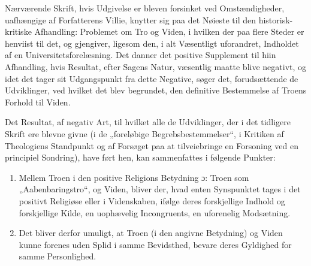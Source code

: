 Nærværende Skrift, hvis Udgivelse er bleven forsinket ved Omstændigheder,
uafhængige af Forfatterens Villie, knytter sig paa det Nøieste til den
historisk-kritiske Afhandling: Problemet om Tro og Viden, i hvilken der paa
flere Steder er henviist til det, og gjengiver, ligesom den, i alt Væsentligt
uforandret, Indholdet af en Universitetsforelæsning. Det danner det positive
Supplement til hiin Afhandling, hvis Resultat, efter Sagens Natur, væsentlig
maatte blive negativt, og idet det tager sit Udgangspunkt fra dette Negative,
søger det, forudsættende de Udviklinger, ved hvilket det blev begrundet, den
definitive Bestemmelse af Troens Forhold til Viden.

Det Resultat, af negativ Art, til hvilket alle de Udviklinger, der i det
tidligere Skrift ere blevne givne (i de „foreløbige Begrebsbestemmelser“, i
Kritiken af Theologiens Standpunkt og af Forsøget paa at tilveiebringe en
Forsoning ved en principiel Sondring), have ført hen, kan sammenfattes i
følgende Punkter:

\begin{enumerate}[label=\arabic*., leftmargin=*, labelsep=1em,
                  topsep=0.35\baselineskip, itemsep=0.35\baselineskip]
\item Mellem Troen i den positive Religions Betydning ɔ: Troen som
  „Aabenbaringstro“, og Viden, bliver der, hvad enten Synspunktet tages i det
  positivt Religiøse eller i Videnskaben, ifølge deres forskjellige Indhold og
  forskjellige Kilde, en uophævelig Incongruents, en uforenelig Modsætning.
\item Det bliver derfor umuligt, at Troen (i den angivne Betydning) og Viden
  kunne forenes uden Splid i samme Bevidsthed, bevare deres Gyldighed for
  samme Personlighed.
\end{enumerate}

